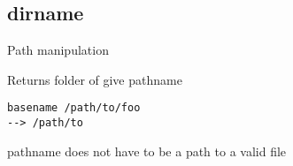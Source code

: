 \subsection{dirname}

\begin{frame}[fragile]{Path manipulation}
  \begin{exampleblock}{Returns folder of give pathname}
    \begin{lstlisting}[showstringspaces=false]
basename /path/to/foo
--> /path/to
    \end{lstlisting}
  \end{exampleblock}
  \pause
pathname does not have to be a path to a valid file
\end{frame}
